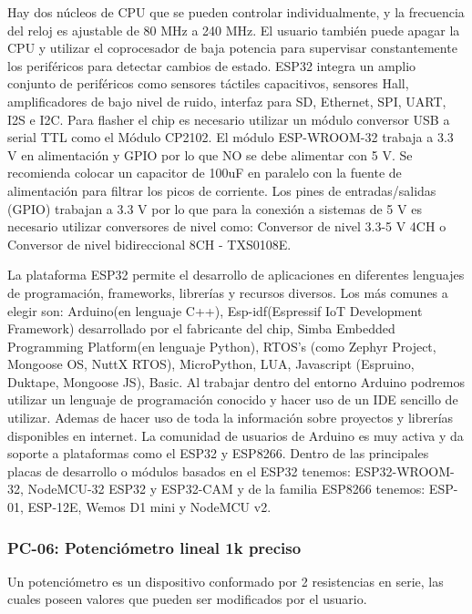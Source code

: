     Hay dos núcleos de CPU que se pueden controlar individualmente, y la frecuencia del reloj es ajustable de 80 MHz a 240 MHz. El usuario también puede apagar la CPU y utilizar el coprocesador de baja potencia para supervisar constantemente los periféricos para detectar cambios de estado. ESP32 integra un amplio conjunto de periféricos como sensores táctiles capacitivos, sensores Hall, amplificadores de bajo nivel de ruido, interfaz para SD, Ethernet, SPI, UART, I2S e I2C. Para flasher el chip es necesario utilizar un módulo conversor USB a serial TTL como el Módulo CP2102.
    El módulo ESP-WROOM-32 trabaja a 3.3 V en alimentación y GPIO por lo que NO se debe alimentar con 5 V. Se recomienda colocar un capacitor de 100uF en paralelo con la fuente de alimentación para filtrar los picos de corriente. Los pines de entradas/salidas (GPIO) trabajan a 3.3 V por lo que para la conexión a sistemas de 5 V es necesario utilizar conversores de nivel como: Conversor de nivel 3.3-5 V 4CH o Conversor de nivel bidireccional 8CH - TXS0108E.
    
    
    La plataforma ESP32 permite el desarrollo de aplicaciones en diferentes lenguajes de programación, frameworks, librerías y recursos diversos. Los más comunes a elegir son: Arduino(en lenguaje C++), Esp-idf(Espressif IoT Development Framework) desarrollado por el fabricante del chip, Simba Embedded Programming Platform(en lenguaje Python), RTOS's (como Zephyr Project, Mongoose OS, NuttX RTOS), MicroPython, LUA, Javascript (Espruino, Duktape, Mongoose JS), Basic. Al trabajar dentro del entorno Arduino podremos utilizar un lenguaje de programación conocido y hacer uso de un IDE sencillo de utilizar. Ademas de hacer uso de toda la información sobre proyectos y librerías disponibles en internet. La comunidad de usuarios de Arduino es muy activa y da soporte a plataformas como el ESP32 y ESP8266. Dentro de las principales placas de desarrollo o módulos basados en el ESP32 tenemos: ESP32-WROOM-32, NodeMCU-32 ESP32 y ESP32-CAM y de la familia ESP8266 tenemos: ESP-01, ESP-12E, Wemos D1 mini y NodeMCU v2.\cite{naylamp}
    
    
    
    \subsubsection{PC-06: Potenciómetro lineal 1k preciso }
    
    Un potenciómetro es un dispositivo conformado por 2 resistencias en serie, las cuales poseen valores que pueden ser modificados por el usuario. 
    
